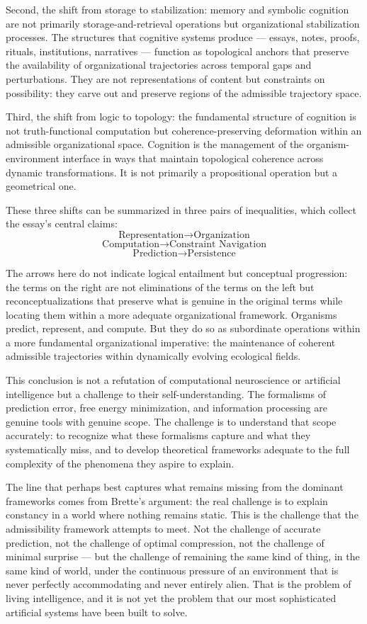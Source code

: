 \documentclass[12pt,a4paper]{report}
\theoremstyle{flyxion}
\begin{document}
Second, the shift from storage to stabilization: memory and symbolic cognition are not primarily storage-and-retrieval operations but organizational stabilization processes. The structures that cognitive systems produce --- essays, notes, proofs, rituals, institutions, narratives --- function as topological anchors that preserve the availability of organizational trajectories across temporal gaps and perturbations. They are not representations of content but constraints on possibility: they carve out and preserve regions of the admissible trajectory space.

Third, the shift from logic to topology: the fundamental structure of cognition is not truth-functional computation but coherence-preserving deformation within an admissible organizational space. Cognition is the management of the organism-environment interface in ways that maintain topological coherence across dynamic transformations. It is not primarily a propositional operation but a geometrical one.

These three shifts can be summarized in three pairs of inequalities, which collect the essay's central claims:
\[
\text{Representation} \longrightarrow \text{Organization}
\]
\[
\text{Computation} \longrightarrow \text{Constraint Navigation}
\]
\[
\text{Prediction} \longrightarrow \text{Persistence}
\]

The arrows here do not indicate logical entailment but conceptual progression: the terms on the right are not eliminations of the terms on the left but reconceptualizations that preserve what is genuine in the original terms while locating them within a more adequate organizational framework. Organisms predict, represent, and compute. But they do so as subordinate operations within a more fundamental organizational imperative: the maintenance of coherent admissible trajectories within dynamically evolving ecological fields.

This conclusion is not a refutation of computational neuroscience or artificial intelligence but a challenge to their self-understanding. The formalisms of prediction error, free energy minimization, and information processing are genuine tools with genuine scope. The challenge is to understand that scope accurately: to recognize what these formalisms capture and what they systematically miss, and to develop theoretical frameworks adequate to the full complexity of the phenomena they aspire to explain.

The line that perhaps best captures what remains missing from the dominant frameworks comes from Brette's argument: the real challenge is to explain constancy in a world where nothing remains static. This is the challenge that the admissibility framework attempts to meet. Not the challenge of accurate prediction, not the challenge of optimal compression, not the challenge of minimal surprise --- but the challenge of remaining the same kind of thing, in the same kind of world, under the continuous pressure of an environment that is never perfectly accommodating and never entirely alien. That is the problem of living intelligence, and it is not yet the problem that our most sophisticated artificial systems have been built to solve.
\end{document}
